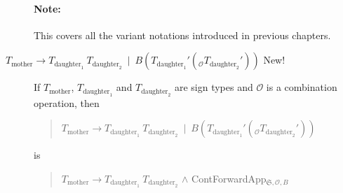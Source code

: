 \begin{description}
  \paragraph{Note:} This covers all the variant notations introduced
  in previous chapters.

\item[\textnormal{$T_{\text{mother}}\longrightarrow
    T_{\text{daughter}_1}\ T_{\text{daughter}_2}\ \mid\
    B(T_{\text{daughter}_1}'(_{\mathcal{O}}T_{\text{daughter}_2}'))$}
  New!] \mbox{}

If $T_{\text{mother}}$, $T_{\text{daughter}_1}$ and
  $T_{\text{daughter}_2}$ are sign types and $\mathcal{O}$ is a
  combination operation, then
  \begin{quote}
    $T_{\text{mother}}\longrightarrow
    T_{\text{daughter}_1}\ T_{\text{daughter}_2}\ \mid\
    B(T_{\text{daughter}_1}'(_{\mathcal{O}}T_{\text{daughter}_2}'))$
  \end{quote}
  is
  \begin{quote}
  $T_{\text{mother}}\longrightarrow
    T_{\text{daughter}_1}\ T_{\text{daughter}_2}$ \d{\d{$\wedge$}}
    ContForwardApp$_{\mathfrak{S},\mathcal{O},B}$
  \end{quote}







\end{description}

